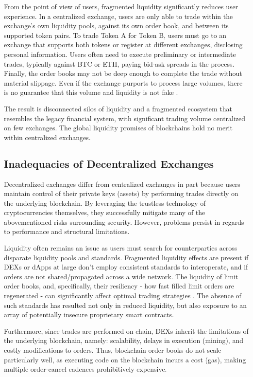 \documentclass[UTF8,nofonts]{article}
\begin{document}
\begin{multicols}{2}
From the point of view of users, fragmented liquidity significantly reduces user experience. In a centralized exchange, users are only able to trade within the exchange's own liquidity pools, against its own order book, and between its supported token pairs. To trade Token A for Token B, users must go to an exchange that supports both tokens or register at different exchanges, disclosing personal information. Users often need to execute preliminary or intermediate trades, typically against BTC or ETH, paying bid-ask spreads in the process. Finally, the order books may not be deep enough to complete the trade without material slippage. Even if the exchange purports to process large volumes, there is no guarantee that this volume and liquidity is not fake \cite{fakevolume}.

The result is disconnected silos of liquidity and a fragmented ecosystem that resembles the legacy financial system, with significant trading volume centralized on few exchanges. The global liquidity promises of blockchains hold no merit within centralized exchanges.

\subsection{Inadequacies of Decentralized Exchanges}
Decentralized exchanges differ from centralized exchanges in part because users maintain control of their private keys (assets) by performing trades directly on the underlying blockchain. By leveraging the trustless technology of cryptocurrencies themselves, they successfully mitigate many of the abovementioned risks surrounding security. However, problems persist in regards to performance and structural limitations. 

Liquidity often remains an issue as users must search for counterparties across disparate liquidity pools and standards. Fragmented liquidity effects are present if DEXs or dApps at large don't employ consistent standards to interoperate, and if orders are not shared/propagated across a wide network. The liquidity of limit order books, and, specifically, their resiliency - how fast filled limit orders are regenerated - can significantly affect optimal trading strategies \cite{limitorderliquidity}. The absence of such standards has resulted not only in reduced liquidity, but also exposure to an array of potentially insecure proprietary smart contracts.

Furthermore, since trades are performed on chain, DEXs inherit the limitations of the underlying blockchain, namely: scalability, delays in execution (mining), and costly modifications to orders. Thus, blockchain order books do not scale particularly well, as executing code on the blockchain incurs a cost (gas), making multiple order-cancel cadences prohibitively expensive. 


\end{multicols}
\end{document}
